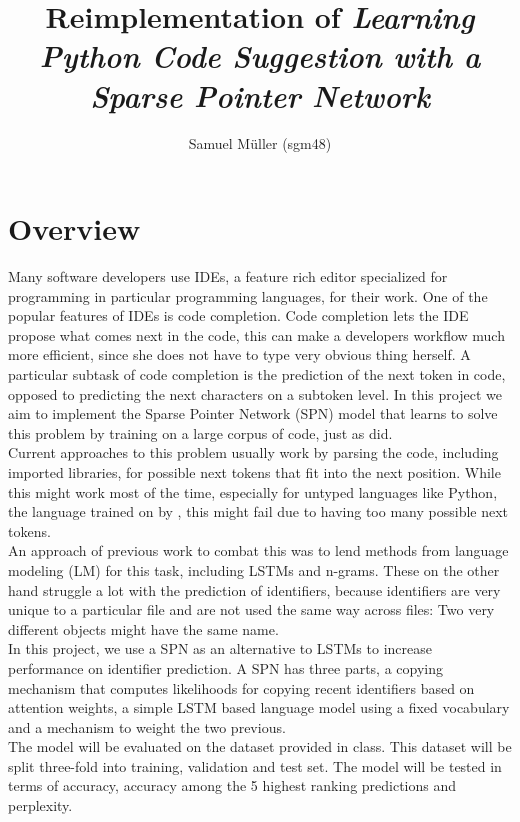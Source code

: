 \documentclass[11pt]{article}
\begin{document}
\title{Reimplementation of \textit{Learning Python Code Suggestion with a Sparse Pointer Network}}
\author{Samuel Müller (sgm48)}
\maketitle
\section{Overview}
Many software developers use IDEs, a feature rich editor specialized for programming in particular programming languages, for their work. One of the popular features of IDEs is code completion. Code completion lets the IDE propose what comes next in the code, this can make a developers workflow much more efficient, since she does not have to type very obvious thing herself.
A particular subtask of code completion is the prediction of the next token in code, opposed to predicting the next characters on a subtoken level.
In this project we aim to implement the Sparse Pointer Network (SPN) \citep{bhoopchand2016learning} model that learns to solve this problem by training on a large corpus of code, just as \cite{bhoopchand2016learning} did.
\\
Current approaches to this problem usually work by parsing the code, including imported libraries, for possible next tokens that fit into the next position. While this might work most of the time, especially for untyped languages like Python, the language trained on by \cite{bhoopchand2016learning}, this might fail due to having too many possible next tokens.\\
An approach of previous work to combat this was to lend methods from language modeling (LM) for this task, including LSTMs and n-grams. These on the other hand struggle a lot with the prediction of identifiers, because identifiers are very unique to a particular file and are not used the same way across files: Two very different objects might have the same name.\\
In this project, we use a SPN as an alternative to LSTMs to increase performance on identifier prediction. A SPN has three parts, a copying mechanism that computes likelihoods for copying recent identifiers based on attention weights, a simple LSTM based language model using a fixed vocabulary and a mechanism to weight the two previous.\\
The model will be evaluated on the dataset provided in class. This dataset will be split three-fold into training, validation and test set. The model will be tested in terms of accuracy, accuracy among the 5 highest ranking predictions and perplexity.
\end{document}
